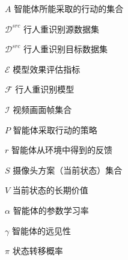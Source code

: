 \begin{denotation}
    \item[$A$]              智能体所能采取的行动的集合
    \item[$\mathcal{D}^{src}$]    行人重识别源数据集
    \item[$\mathcal{D}^{src}$]    行人重识别目标数据集
    \item[$\mathcal{E}$]    模型效果评估指标
    \item[$\mathcal{F}$]    行人重识别模型
    \item[$\mathcal{I}$]    视频画面帧集合
    \item[$P$]              智能体采取行动的策略
    \item[$r$]              智能体从环境中得到的反馈
    \item[$S$]              摄像头方案（当前状态）集合
    \item[$V$]              当前状态的长期价值
    \item[$\alpha$]         智能体的参数学习率
    \item[$\gamma$]         智能体的远见性
    \item[$\pi$]            状态转移概率
\end{denotation}
